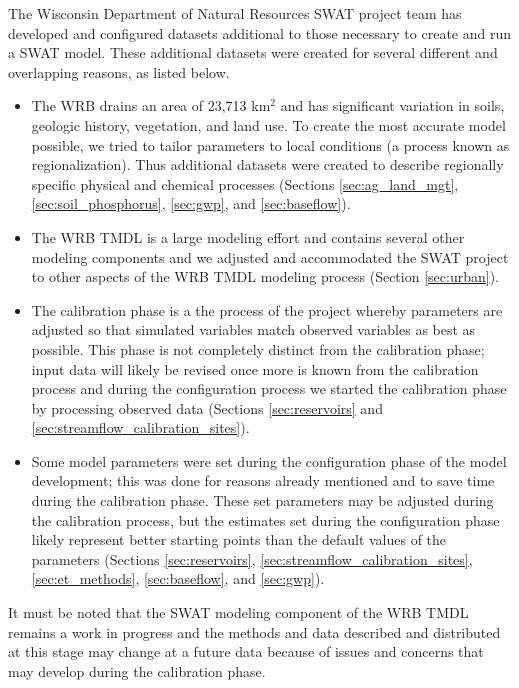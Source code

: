 The Wisconsin Department of Natural Resources SWAT project team has developed and configured datasets additional to those necessary to create and run a SWAT model. These additional datasets were created for several different and overlapping reasons, as listed below. 
\begin{itemize}
\item The WRB drains an area of 23,713 km$^2$ and has significant variation in soils, geologic history, vegetation, and land use. To create the most accurate model possible, we tried to tailor parameters to local conditions (a process known as regionalization).  Thus additional datasets were created to describe regionally specific physical and chemical processes (Sections \ref{sec:ag_land_mgt}, \ref{sec:soil_phosphorus}, \ref{sec:gwp}, and \ref{sec:baseflow}).

\item The WRB TMDL is a large modeling effort and contains several other modeling components and we adjusted and accommodated the SWAT project to other aspects of the WRB TMDL modeling process (Section \ref{sec:urban}).

\item The calibration phase is a the process of the project whereby parameters are adjusted so that simulated variables match observed variables as best as possible. This phase is not completely distinct from the calibration phase; input data will likely be revised once more is known from the calibration process and during the configuration process we started the calibration phase by processing observed data (Sections \ref{sec:reservoirs} and \ref{sec:streamflow_calibration_sites}).
 
\item Some model parameters were set during the configuration phase of the model development; 
this was done for reasons already mentioned and to save time during the calibration phase. 
These set parameters may be adjusted during the calibration process, but the estimates set during the configuration phase likely represent better starting points than the default values of the parameters (Sections \ref{sec:reservoirs}, \ref{sec:streamflow_calibration_sites},\ref{sec:et_methods}, \ref{sec:baseflow}, and \ref{sec:gwp}).
\end{itemize}

It must be noted that the SWAT modeling component of the WRB TMDL remains a work in progress and the methods and data described and distributed at this stage may change at a future data because of issues and concerns that may develop during the calibration phase.


